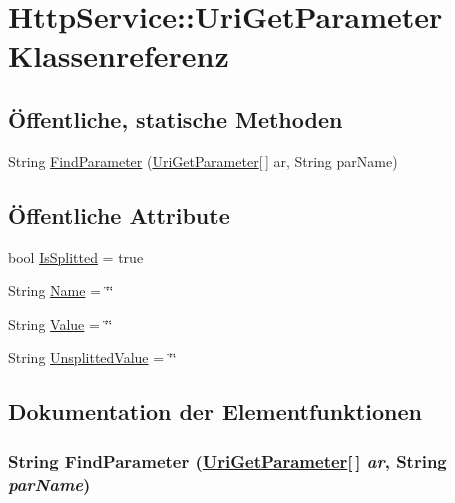 \hypertarget{classQbeSAS_1_1HttpService_1_1UriGetParameter}{
\section{Http\-Service::Uri\-Get\-Parameter Klassenreferenz}
\label{classQbeSAS_1_1HttpService_1_1UriGetParameter}
}
\subsection*{\"{O}ffentliche, statische Methoden}
\begin{CompactItemize}
\item 
String \hyperlink{classQbeSAS_1_1HttpService_1_1UriGetParameter_QbeSAS_1_1HttpService_1_1UriGetParametere0}{Find\-Parameter} (\hyperlink{classQbeSAS_1_1HttpService_1_1UriGetParameter}{Uri\-Get\-Parameter}\mbox{[}$\,$\mbox{]} ar, String par\-Name)
\end{CompactItemize}
\subsection*{\"{O}ffentliche Attribute}
\begin{CompactItemize}
\item 
bool \hyperlink{classQbeSAS_1_1HttpService_1_1UriGetParameter_QbeSAS_1_1HttpService_1_1UriGetParametero0}{Is\-Splitted} = true
\item 
String \hyperlink{classQbeSAS_1_1HttpService_1_1UriGetParameter_QbeSAS_1_1HttpService_1_1UriGetParametero1}{Name} = \char`\"{}\char`\"{}
\item 
String \hyperlink{classQbeSAS_1_1HttpService_1_1UriGetParameter_QbeSAS_1_1HttpService_1_1UriGetParametero2}{Value} = \char`\"{}\char`\"{}
\item 
String \hyperlink{classQbeSAS_1_1HttpService_1_1UriGetParameter_QbeSAS_1_1HttpService_1_1UriGetParametero3}{Unsplitted\-Value} = \char`\"{}\char`\"{}
\end{CompactItemize}


\subsection{Dokumentation der Elementfunktionen}
\hypertarget{classQbeSAS_1_1HttpService_1_1UriGetParameter_QbeSAS_1_1HttpService_1_1UriGetParametere0}{
\subsubsection[FindParameter]{\setlength{\rightskip}{0pt plus 5cm}String Find\-Parameter (\hyperlink{classQbeSAS_1_1HttpService_1_1UriGetParameter}{Uri\-Get\-Parameter}\mbox{[}$\,$\mbox{]} {\em ar}, String {\em par\-Name})}}
\label{classQbeSAS_1_1HttpService_1_1UriGetParameter_QbeSAS_1_1HttpService_1_1UriGetParametere0}




